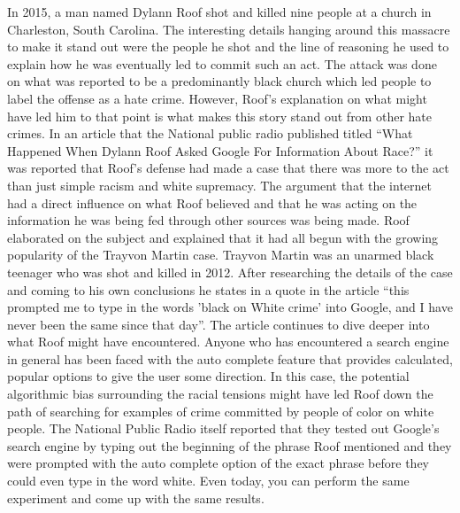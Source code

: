 \documentclass[sigconf]{acmart}
\begin{document}
In 2015, a man named Dylann Roof shot and killed nine people at a church in Charleston, South Carolina. The interesting details hanging around this massacre to make it stand out were the people he shot and the line of reasoning he used to explain how he was eventually led to commit such an act. The attack was done on what was reported to be a predominantly black church which led people to label the offense as a hate crime. However, Roof's explanation on what might have led him to that point is what makes this story stand out from other hate crimes. In an article that the National public radio published titled ``What Happened When Dylann Roof Asked Google For Information About Race?'' it was reported that Roof's defense had made a case that there was more to the act than just simple racism and white supremacy\cite{Hersher2017}. The argument that the internet had a direct influence on what Roof believed and that he was acting on the information he was being fed through other sources was being made. Roof elaborated on the subject and explained that it had all begun with the growing popularity of the Trayvon Martin case. Trayvon Martin was an unarmed black teenager who was shot and killed in 2012. After researching the details of the case and coming to his own conclusions he states in a quote in the article ``this prompted me to type in the words 'black on White crime' into Google, and I have never been the same since that day''\cite{Hersher2017}. The article continues to dive deeper into what Roof might have encountered. Anyone who has encountered a search engine in general has been faced with the auto complete feature that provides calculated, popular options to give the user some direction. In this case, the potential algorithmic bias surrounding the racial tensions might have led Roof down the path of searching for examples of crime committed by people of color on white people. The National Public Radio itself reported that they tested out Google's search engine by typing out the beginning of the phrase Roof mentioned and they were prompted with the auto complete option of the exact phrase before they could even type in the word white\cite{Hersher2017}. Even today, you can perform the same experiment and come up with the same results.
\end{document}
